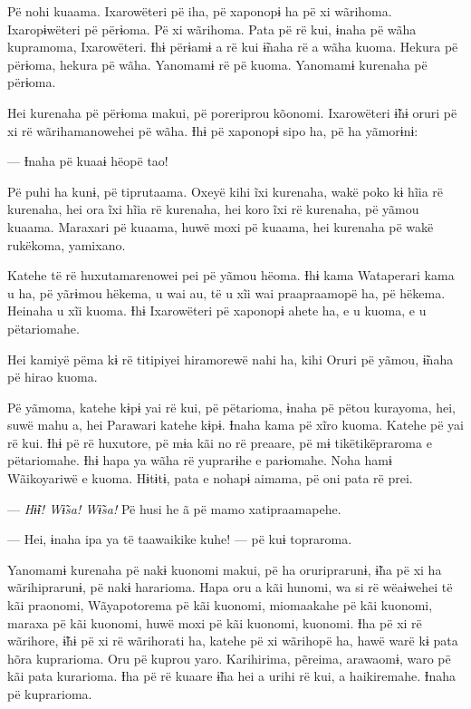 Pë nohi kuaama. Ixarowëteri pë iha, pë xaponopɨ ha pë xi wãrihoma.
 Ixaropɨwëteri pë përɨoma. Pë xi wãrihoma. Pata pë rë kui, ɨnaha pë wãha
 kupramoma, Ixarowëteri. Ɨhɨ përɨamɨ a rë kui ɨ̃naha rë a wãha kuoma.
 Hekura pë përɨoma, hekura pë wãha. Yanomamɨ rë pë kuoma. Yanomamɨ
 kurenaha pë përɨoma. 

Hei kurenaha pë përɨoma makui, pë poreriprou kõonomi. Ixarowëteri ɨ̃hɨ
oruri pë xi rë wãrihamanowehei pë wãha. Ɨhɨ pë xaponopɨ sipo ha, pë ha
yãmorɨnɨ: 

--- Ɨnaha pë kuaaɨ hëopë tao! 

Pë puhi ha kunɨ, pë tiprutaama. Oxeyë kihi ĩxi kurenaha, wakë poko kɨ
 hĩia rë kurenaha, hei ora ĩxi hĩia rë kurenaha, hei koro ĩxi rë
 kurenaha, pë yãmou kuaama. Maraxari pë kuaama, huwë moxi pë kuaama, hei
 kurenaha pë wakë rukëkoma, yamixano. 

Katehe të rë huxutamarenowei pei pë yãmou hëoma. Ɨhɨ kama Wataperari
kama u ha, pë yãrɨmou hëkema, u wai au, të u xĩi wai praapraamopë ha, pë
hëkema. Heinaha u xĩi kuoma. Ɨhɨ Ixarowëteri pë xaponopɨ ahete ha, e u
kuoma, e u pëtariomahe. 

Hei kamiyë pëma kɨ rë titipiyei hiramorewë nahi ha, kihi Oruri pë yãmou,
ɨ̃naha pë hirao kuoma. 

Pë yãmoma, katehe kɨpɨ yai rë kui, pë pëtarioma, ɨnaha pë pëtou
 kurayoma, hei, suwë mahu a, hei Parawari katehe kɨpɨ. Ɨnaha kama pë xĩro
 kuoma. Katehe pë yai rë kui. Ɨhɨ pë rë huxutore, pë mɨa kãi no rë
 preaare, pë mɨ tikëtikëpraroma e pëtariomahe. Ɨhɨ hapa ya wãha rë
 yuprarɨhe e parɨomahe. Noha hamɨ Wãikoyariwë e kuoma. Hɨtɨtɨ, pata e
 nohapɨ aimama, pë oni pata rë prei.

--- \textit{Hɨ̃ɨ! Wɨ̃sa! Wɨ̃sa! }Pë husi he ã pë mamo xatipraamapehe. 

--- Hei, ɨnaha ipa ya të taawaikike kuhe! --- pë kuɨ topraroma. 

Yanomamɨ kurenaha pë nakɨ kuonomi makui, pë ha oruriprarunɨ, ɨ̃ha pë xi
 ha wãrihiprarunɨ, pë nakɨ hararioma. Hapa oru a kãi hunomi, wa si rë
 wëaɨwehei të kãi praonomi, Wãyapotorema pë kãi kuonomi, miomaakahe pë
 kãi kuonomi, maraxa pë kãi kuonomi, huwë moxi pë kãi kuonomi, kuonomi.
 Ɨha pë xi rë wãrihore, ɨ̃hɨ pë xi rë wãrihorati ha, katehe pë xi wãrihopë
 ha, hawë warë kɨ pata hõra kuprarioma. Oru pë kuprou yaro. Karihirima,
 pẽreima, arawaomɨ, waro pë kãi pata kurarioma. Ɨha pë rë kuaare ɨ̃ha hei
 a urihi rë kui, a haikiremahe. Ɨnaha pë kuprarioma. 

